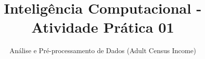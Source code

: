 \documentclass[abnt]{slides}
\title{Inteligência Computacional - Atividade Prática 01}
\subtitle{Análise e Pré-processamento de Dados (Adult Census Income)}
\begin{document}
\maketitle{}




\end{document}
